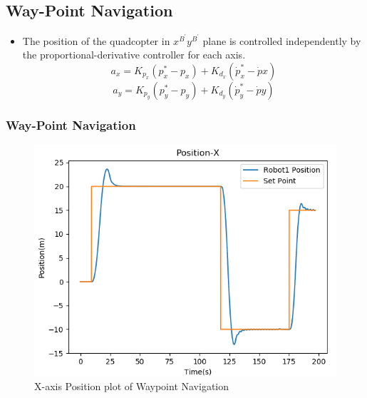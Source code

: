 \documentclass[10pt]{beamer}
\begin{document}
\subsection*{Way-Point Navigation}
\begin{frame}
	\begin{itemize}
		\item  The position of the quadcopter in $x^{B^{\prime}}y^{B^{\prime}}$ plane is controlled independently by  the proportional-derivative controller for each axis.
		      \begin{equation*}\label{x-pos-control}
			      a_{x} = K_{p_{x}}\left(p_{x}^{*}-p_{x}\right)+K_{d_{x}}\left(\dot{p}_{x}^{*}-\dot{p}{x}\right)
		      \end{equation*}
		      \begin{equation*}\label{y-pos-control}
			      a_{y} = K_{p_{y}}\left(p_{y}^{*}-p_{y}\right)+K_{d_{y}}\left(\dot{p}_{y}^{*}-\dot{p}{y}\right)
		      \end{equation*}
	\end{itemize}
	\pause
	\frametitle{Way-Point Navigation}
	\begin{minipage}{0.47\textwidth}
		\begin{figure}[h!]
			\centering
			\includegraphics[scale=0.27]{Position-X-single.png}
			\caption{X-axis Position plot of Waypoint Navigation}
			\label{Fig:pos_x}
		\end{figure}
	\end{minipage}
	\begin{minipage}{0.47\textwidth}
		\begin{figure}[h!]
			\centering

\end{figure}
\end{minipage}
\end{frame}
\end{document}

